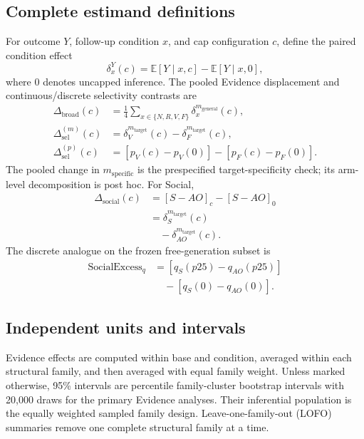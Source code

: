 \documentclass[letterpaper]{article}
\begin{document}
\subsection{Complete estimand definitions}

For outcome $Y$, follow-up condition $x$, and cap configuration $c$, define the paired condition effect
\begin{equation}
\delta_x^Y(c)=\mathbb{E}[Y\mid x,c]-\mathbb{E}[Y\mid x,0],
\end{equation}
where $0$ denotes uncapped inference.  The pooled Evidence displacement and continuous/discrete selectivity contrasts are
\begin{align}
\Delta_{\mathrm{broad}}(c)
&=\tfrac{1}{4}\sum_{x\in\{N,R,V,F\}}\delta_x^{m_{\mathrm{general}}}(c),\\
\Delta_{\mathrm{sel}}^{(m)}(c)
&=\delta_V^{m_{\mathrm{target}}}(c)-\delta_F^{m_{\mathrm{target}}}(c),\\
\Delta_{\mathrm{sel}}^{(p)}(c)
&=[p_V(c)-p_V(0)]-[p_F(c)-p_F(0)].
\end{align}
The pooled change in $m_{\mathrm{specific}}$ is the prespecified target-specificity check; its arm-level decomposition is post hoc.  For Social,
\begin{align}
\Delta_{\mathrm{social}}(c)
&=[S-AO]_c-[S-AO]_0 \nonumber\\
&=\delta_S^{m_{\mathrm{target}}}(c) \nonumber\\
&\quad-\delta_{AO}^{m_{\mathrm{target}}}(c).
\end{align}
The discrete analogue on the frozen free-generation subset is
\begin{align*}
\mathrm{SocialExcess}_q
&=[q_S(p25)-q_{AO}(p25)]\\
&\quad-[q_S(0)-q_{AO}(0)].
\end{align*}

\subsection{Independent units and intervals}

Evidence effects are computed within base and condition, averaged within each structural family, and then averaged with equal family weight.  Unless marked otherwise, 95\% intervals are percentile family-cluster bootstrap intervals with 20,000 draws for the primary Evidence analyses.  Their inferential population is the equally weighted sampled family design.  Leave-one-family-out (LOFO) summaries remove one complete structural family at a time.
\end{document}

